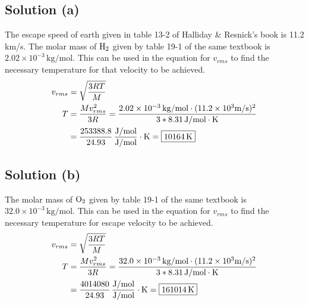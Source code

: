 \documentclass[12pt]{article}
\newcommand{\E}[1]{\times 10^{#1}}
\begin{document}
        \subsection{Solution (a)}
            The escape speed of earth given in table 13-2 of Halliday \& Resnick's book is 11.2 \unit{\kilo\meter/\second}.
            The molar mass of $\rm H_2$ given by table 19-1 of the same textbook is $2.02\E{-3}\,\unit{\kilo\gram/\mole}$.
            This can be used in the equation for $v_{rms}$ to find the necessary temperature for that velocity to be achieved.
            \begin{align}
                v_{rms} &=  \sqrt{\frac{3RT}{M}}\\
                T   &=  \frac{M v_{rms}^2}{3R}
                    =   \frac{2.02\E{-3}\,\unit{\kilo\gram/\mole} \cdot (11.2\E{3} \unit{\meter/\second})^2}{3 * 8.31\,\unit{\joule/\mole\cdot\kelvin}}\\
                    &=  \frac{253388.8}{24.93}\,\unit{\frac{\joule/\mole}{\joule/\mole}\cdot\kelvin}
                    =   \boxed{10164\,\unit{\kelvin}}
            \end{align}

        \subsection{Solution (b)}
            The molar mass of $\rm O_2$ given by table 19-1 of the same textbook is $32.0\E{-3}\,\unit{\kilo\gram/\mole}$.
            This can be used in the equation for $v_{rms}$ to find the necessary temperature for escape velocity to be achieved.
            \begin{align}
                v_{rms} &=  \sqrt{\frac{3RT}{M}}\\
                T   &=  \frac{M v_{rms}^2}{3R}
                    =   \frac{32.0\E{-3}\,\unit{\kilo\gram/\mole} \cdot (11.2\E{3} \unit{\meter/\second})^2}{3 * 8.31\,\unit{\joule/\mole\cdot\kelvin}}\\
                    &=  \frac{4014080}{24.93}\,\unit{\frac{\joule/\mole}{\joule/\mole}\cdot\kelvin}
                    =   \boxed{161014\,\unit{\kelvin}}
            \end{align}
\end{document}
